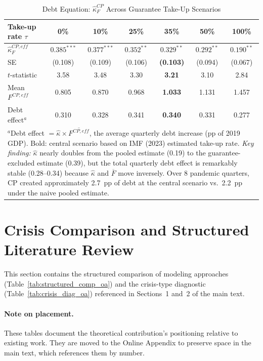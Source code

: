 \documentclass[12pt, a4paper]{article}
\begin{document}
\begin{table}[htbp]
\centering
\caption{Debt Equation: $\hat{\kappa}_F^{CP}$ Across Guarantee Take-Up Scenarios}
\label{tab:takeup}
\small
\begin{tabular}{lcccccc}
\toprule
Take-up rate $\tau$ & 0\% & 10\% & 25\% & \textbf{35\%} & 50\% & 100\% \\
\midrule
$\hat{\kappa}_F^{CP,eff}$
  & $0.385^{***}$ & $0.377^{***}$ & $0.352^{**}$ & $\mathbf{0.329^{**}}$ & $0.292^{**}$ & $0.190^{**}$ \\
SE
  & (0.108) & (0.109) & (0.106) & \textbf{(0.103)} & (0.094) & (0.067) \\
$t$-statistic
  & 3.58 & 3.48 & 3.30 & \textbf{3.21} & 3.10 & 2.84 \\
Mean $F^{CP,eff}$
  & 0.805 & 0.870 & 0.968 & \textbf{1.033} & 1.131 & 1.457 \\
Debt effect$^a$
  & 0.310 & 0.328 & 0.341 & \textbf{0.340} & 0.331 & 0.277 \\
\bottomrule
\multicolumn{7}{p{13cm}}{\footnotesize $^a$Debt effect $= \hat{\kappa} \times \overline{F^{CP,eff}}$, the average quarterly debt increase (pp of 2019 GDP). Bold: central scenario based on IMF (2023) estimated take-up rate. \textit{Key finding:} $\hat{\kappa}$ nearly doubles from the pooled estimate (0.19) to the guarantee-excluded estimate (0.39), but the total quarterly debt effect is remarkably stable (0.28--0.34) because $\hat{\kappa}$ and $\overline{F}$ move inversely. Over 8 pandemic quarters, CP created approximately 2.7~pp of debt at the central scenario vs.\ 2.2~pp under the naive pooled estimate.} \\
\end{tabular}
\end{table}


\section{Crisis Comparison and Structured Literature Review}
\label{app:crisis}

This section contains the structured comparison of modeling approaches (Table~\ref{tab:structured_comp_oa}) and the crisis-type diagnostic (Table~\ref{tab:crisis_diag_oa}) referenced in Sections~1 and~2 of the main text.

\paragraph{Note on placement.} These tables document the theoretical contribution's positioning relative to existing work. They are moved to the Online Appendix to preserve space in the main text, which references them by number.
\end{document}
